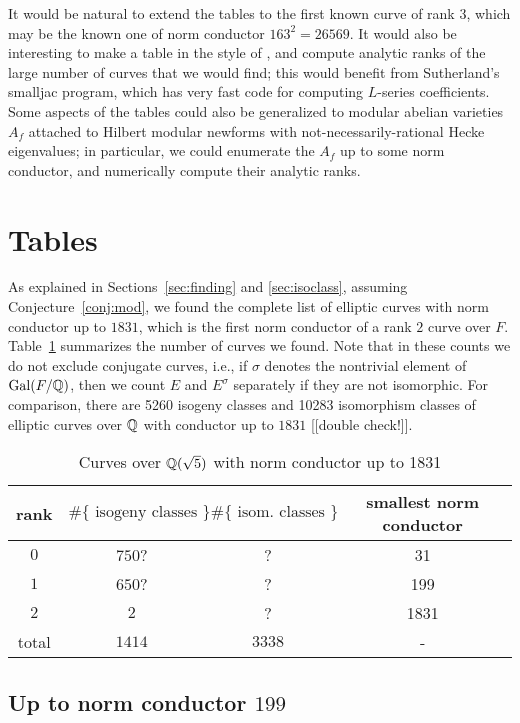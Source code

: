 \documentclass{amsart}
\begin{document}
It would be natural to extend the tables to the first known curve of
rank $3$, which may be the known one of norm conductor $163^2=26569$.
It would also be interesting to make a table in the style of
\cite{stein-watkins:ants5}, and compute analytic ranks of the large
number of curves that we would find; this would benefit from
Sutherland's smalljac program, which has very fast code for computing
$L$-series coefficients.  Some aspects of the tables could also be
generalized to modular abelian varieties $A_f$ attached to Hilbert
modular newforms with not-necessarily-rational Hecke eigenvalues; in
particular, we could enumerate the $A_f$ up to some norm conductor,
and numerically compute their analytic ranks.

\section{Tables}\label{sec:tables}

As explained in Sections~\ref{sec:finding} and \ref{sec:isoclass},
assuming Conjecture~\ref{conj:mod}, we found the complete list of
elliptic curves with norm conductor up to $1831$, which is the first
norm conductor of a rank $2$ curve over $F$.  Table~\ref{table:counts}
summarizes the number of curves we found.  Note that in these counts
we do not exclude conjugate curves, i.e., if $\sigma$ denotes the
nontrivial element of $\operatorname{Gal}(F/\mathbb{Q})$, then we count $E$ and $E^{\sigma}$
separately if they are not isomorphic.  For comparison, 
there are 5260 isogeny classes and 10283 isomorphism classes
of elliptic curves over $\mathbb{Q}$ with conductor up to $1831$ [[double check!]].
\begin{center}
\begin{table}[h]
\caption{Curves over $\mathbb{Q}(\sqrt{5})$ with norm conductor up to 1831\label{table:counts}}
\begin{tabular}{|c|c|c|c|}\hline
rank & $\#\{\text{ isogeny classes }\}$ &  $\#\{\text{ isom. classes }\}$ & smallest norm conductor\\\hline
 $0$ & $750$? & ? & 31\\\hline
 $1$ & $650$? & ? & 199\\\hline
 $2$ & $2$ & ?  & 1831\\\hline
total & $1414$ & $3338$ & - \\\hline
\end{tabular}
\end{table}
\end{center}

\subsection{Up to norm conductor  $199$}\label{sec:to199}
\end{document}
